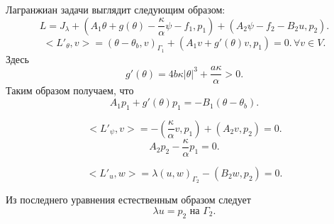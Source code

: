 Лагранжиан задачи выглядит следующим образом:
\begin{equation}
    \label{eq:lagrange}
    L = J_\lambda + (A_1 \theta+ g(\theta) - \frac{\kappa}{\alpha}\psi -f_1, p_1)
    + (A_2 \psi - f_2 - B_2 u, p_2).
\end{equation}
\begin{equation}
    \label{eq:lagrange_t}
    <L'_\theta, v> = (\theta - \theta_b, v)_{\Gamma_1}
    + (A_1 v + g'(\theta)v, p_1) = 0.\, \forall v \in V.
\end{equation}
Здесь
\[
    g'(\theta) = 4 b \kappa |\theta |^ 3 + \frac{a \kappa}{\alpha}  > 0.
\]
Таким образом получаем, что
\begin{equation}
    \label{eq:a1}
    A_1 p_1 + g'(\theta) p_1 = - B_1(\theta - \theta_b).
\end{equation}

\begin{equation}
    \label{lagrange_p}
    <L'_\psi, v> = - ( \frac{\kappa}{\alpha} v, p_1) + (A_2v, p_2) = 0.
\end{equation}
\begin{equation}
    \label{eq:a2}
    A_2 p_2 - \frac{\kappa}{\alpha} p_1 = 0.
\end{equation}

\begin{equation}
    \label{eq:lagrange_u}
    <L'_u, w> = \lambda(u, w)_{\Gamma_2} - (B_2w, p_2) = 0.
\end{equation}

Из последнего уравнения естественным образом следует
\begin{equation}
    \label{a3}
    \lambda u = p_2 \text{ на } \Gamma_2.
\end{equation}

